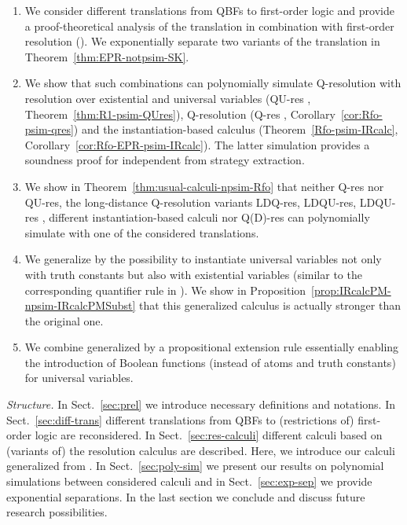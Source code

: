 \documentclass{llncs}
\newcommand{\qres}{\mbox{\sf Q-res}}
\newcommand{\qures}{\mbox{\sf QU-res}}
\newcommand{\qdres}{\mbox{\sf Q(D)-res}}
\newcommand{\ldqres}{\mbox{\sf LDQ-res}}
\newcommand{\ldqures}{\mbox{\sf LDQU-res}}
\newcommand{\ldqupres}{\mbox{\sf LDQU{}-res}}
\newcommand{\Rfo}{}
\newcommand{\IRcalc}{}
\begin{document}
\begin{enumerate}
\item We consider different translations from QBFs to first-order
  logic \cite{DBLP:conf/cade/SeidlLB12} and provide a
  proof-theoretical analysis of the translation in combination with
  first-order resolution (\Rfo). We exponentially separate two
  variants of the translation in Theorem~\ref{thm:EPR-notpsim-SK}.

\item We show that such combinations can polynomially simulate
  Q-resolution with resolution over existential and universal
  variables (\qures{} \cite{DBLP:conf/cp/Gelder12}, 
  Theorem~\ref{thm:R1-psim-QUres}), Q-resolution (\qres{}
  \cite{DBLP:journals/iandc/BuningKF95}, 
  Corollary~\ref{cor:Rfo-psim-qres}) and the instantiation-based
  calculus \IRcalc{} \cite{DBLP:conf/mfcs/BeyersdorffCJ14}
  (Theorem~\ref{Rfo-psim-IRcalc},
  Corollary~\ref{cor:Rfo-EPR-psim-IRcalc}). The latter simulation
  provides a soundness proof for \IRcalc{} independent from strategy
  extraction.

\item We show in Theorem~\ref{thm:usual-calculi-npsim-Rfo} that
  neither \qres{} nor \qures, the long-distance Q-resolution variants
  \ldqres, \ldqures, \ldqupres{}
  \cite{DBLP:conf/iccad/ZhangM02,DBLP:journals/fmsd/BalabanovJ12,BWJ:SAT14},
  different in\-stan\-tiation-based calculi
  \cite{DBLP:conf/mfcs/BeyersdorffCJ14} nor \qdres{}
  \cite{SlivovskySzeider-SAT14} can polynomially simulate \Rfo{} with
  one of the considered translations.

\item We generalize \IRcalc{} by the possibility to instantiate
  universal variables not only with truth constants but also with
  existential variables (similar to the corresponding quantifier rule
  in \cite{DBLP:conf/sat/Egly12}). We show in
  Proposition~\ref{prop:IRcalcPM-npsim-IRcalcPMSubst} that this
  generalized calculus is actually stronger than the original one.

\item We combine generalized \IRcalc{} by a propositional extension
  rule \cite{Tseitin:1968,BCJ-AAAI-WS16}
  essentially enabling the introduction of Boolean functions (instead
  of atoms and truth constants) for universal variables.

\end{enumerate}


\noindent
\emph{Structure.}  In Sect.~\ref{sec:prel} we introduce necessary
definitions and notations. In Sect.~\ref{sec:diff-trans} different
translations from QBFs to (restrictions of) first-order logic
\cite{DBLP:conf/cade/SeidlLB12} are reconsidered. In
Sect.~\ref{sec:res-calculi} different calculi based on (variants of)
the resolution calculus are described. Here, we introduce our calculi
generalized from \IRcalc. In Sect.~\ref{sec:poly-sim} we present our
results on polynomial simulations between considered calculi and in
Sect.~\ref{sec:exp-sep} we provide exponential separations. In the
last section we conclude and discuss future research possibilities.
\end{document}
